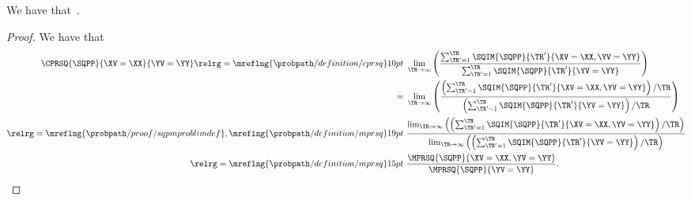 \begin{proposition}
  We have that\ \cprsqexprprop.%
\end{proposition}

\begin{proof}
  We have that
  \begin{align*}
    \CPRSQ{\SQPP}{\XV = \XX}{\YV = \YY} 
    \relrg = {\mreflng{\probpath/definition/cprsq}} 10pt \ & 
    \lim_{\TR \rightarrow \infty}
    \left(
    \frac
    {\sum_{\TR' = 1}^{\TR}\SQIM{\SQPP}{\TR'}{\XV = \XX, \YV = \YY}}
    {\sum_{\TR' = 1}^{\TR}\SQIM{\SQPP}{\TR'}{\YV = \YY}}
    \right)\\
    = \ &
    \lim_{\TR \rightarrow \infty}
    \left(
    \frac
    {\left({\sum_{\TR' = 1}^{\TR}\SQIM{\SQPP}{\TR'}{\XV = \XX, \YV = \YY}}\right)/{\TR}}
    {\left(\sum_{\TR' = 1}^{\TR}\SQIM{\SQPP}{\TR'}{\YV = \YY}\right)/\TR}
    \right)\\
    \relrg = {\mreflng{\probpath/proof/sqpmproblimdef},\mreflng{\probpath/definition/mprsq}} 19pt \ & 
    \frac
    {
      \lim_{\TR \rightarrow \infty}\left(
    \left({\sum_{\TR' = 1}^{\TR}\SQIM{\SQPP}{\TR'}{\XV = \XX, \YV = \YY}}\right)/{\TR}\right)}
    {
      \lim_{\TR \rightarrow \infty}\left(
    \left(\sum_{\TR' = 1}^{\TR}\SQIM{\SQPP}{\TR'}{\YV = \YY}\right)/\TR\right)}
    \\
    \relrg = {\mreflng{\probpath/definition/mprsq}} 15pt \ & 
    \frac { \MPRSQ{\SQPP}{\XV = \XX, \YV = \YY} } { \MPRSQ{\SQPP}{\YV = \YY} }.
  \end{align*}
\end{proof}
